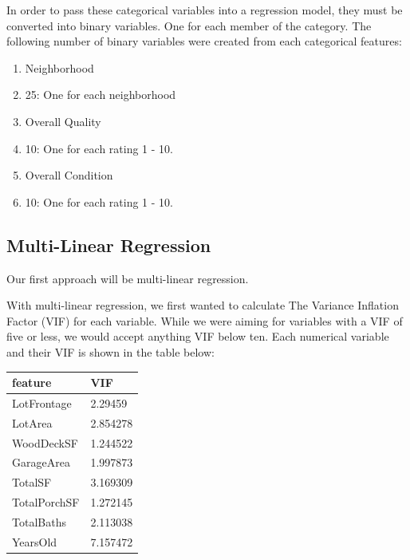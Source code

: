 \documentclass{article}
\begin{document}
	In order to pass these categorical variables into a regression model, they must be converted into binary variables. One for each member of the category. The following number of binary variables were created from each categorical features:

	\begin{enumerate}
		\item Neighborhood
		\item[\textbullet] 25: One for each neighborhood
		\item Overall Quality
		\item[\textbullet] 10: One for each rating 1 - 10.
		\item Overall Condition
		\item[\textbullet] 10: One for each rating 1 - 10.
	\end{enumerate}

	\subsection{Multi-Linear Regression}

	Our first approach will be multi-linear regression.

	With multi-linear regression, we first wanted to calculate The Variance Inflation Factor (VIF) for each variable. While we were aiming for variables with a VIF of five or less, we would accept anything VIF below ten. Each numerical variable and their VIF is shown in the table below:

	\begin{table}[H]
		\centering
		\begin{tabular}{ll}
		\hline
		\multicolumn{1}{|l|}{feature} & \multicolumn{1}{l|}{VIF} \\ \hline
		LotFrontage                   & 2.29459                  \\
		LotArea                       & 2.854278                 \\
		WoodDeckSF                    & 1.244522                 \\
		GarageArea                    & 1.997873                 \\
		TotalSF                       & 3.169309                 \\
		TotalPorchSF                  & 1.272145                 \\
		TotalBaths                    & 2.113038                 \\
		YearsOld                      & 7.157472                
		\end{tabular}
		\end{table}
		
\end{document}
